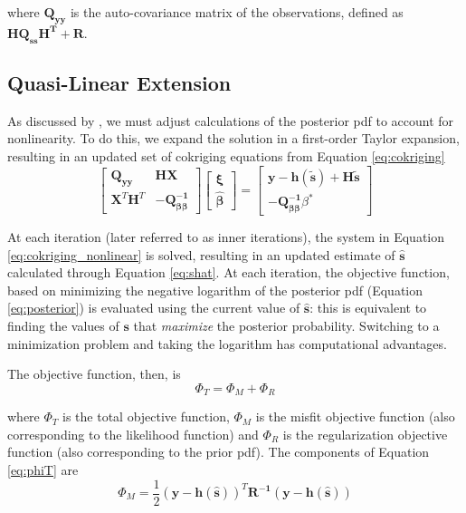 \documentclass[11pt,oneside,onecolumn]{usgsreport}
\begin{document}
\begin{appendix}
where $\mathbf{Q_{yy}}$ is the auto-covariance matrix of the observations,
defined as $\mathbf{HQ_{ss}H^{\mathbf{T}}+R}$.


\subsection{Quasi-Linear Extension}

As discussed by \citet{Kitanidis1995}, we must adjust calculations
of the posterior pdf to account for nonlinearity. To do this, we expand
the solution in a first-order Taylor expansion, resulting in an updated
set of cokriging equations from Equation \ref{eq:cokriging}
\begin{equation}
\left[\begin{array}{cc}
\mathbf{Q_{yy}} & \mathbf{HX}\\
\mathbf{X}^{T}\mathbf{H}^{T} & \mathbf{-}\mathbf{Q_{\beta\beta}^{-1}}
\end{array}\right]\left[\begin{array}{c}
\mathbf{\xi}\\
\mathbf{\hat{\beta}}
\end{array}\right]=\left[\begin{array}{c}
\mathbf{y}-\mathbf{h}\left(\mathbf{\tilde{s}}\right)+\mathbf{H}\tilde{\mathbf{s}}\\
\mathbf{-}\mathbf{Q_{\beta\beta}^{-1}}\beta^{*}
\end{array}\right]\label{eq:cokriging_nonlinear}
\end{equation}


At each iteration (later referred to as inner iterations), the system
in Equation \ref{eq:cokriging_nonlinear} is solved, resulting in
an updated estimate of $\hat{\mathbf{s}}$ calculated through Equation
\ref{eq:shat}. At each iteration, the objective function, based on
minimizing the negative logarithm of the posterior pdf (Equation \ref{eq:posterior})
is evaluated using the current value of $\mathbf{\hat{s}}$: this
is equivalent to finding the values of $\mathbf{s}$ that \emph{maximize
}the posterior probability. Switching to a minimization problem and
taking the logarithm has computational advantages. 

The objective function, then, is 
\begin{equation}
\Phi_{T}=\Phi_{M}+\Phi_{R}\label{eq:phiT}
\end{equation}


where $\Phi_{T}$ is the total objective function, $\Phi_{M}$
is the misfit objective function (also corresponding to the likelihood
function) and $\Phi_{R}$ is the regularization objective
function (also corresponding to the prior pdf). The components of
Equation \ref{eq:phiT} are
\[
\Phi_{M}=\frac{1}{2}\left(\mathbf{y-h}(\mathbf{\hat{s}})\right)^{T}\mathbf{R^{-1}\left(\mathbf{y-h}(\mathbf{\hat{s}})\right)}
\]



\end{appendix}
\end{document}
